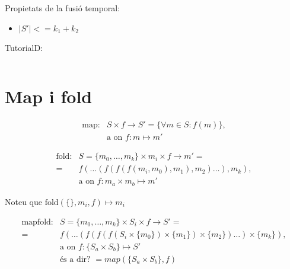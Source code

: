 Propietats de la fusió temporal:
\begin{itemize}
\item $|S'| <= k_1 + k_2$
\end{itemize}





TutorialD:
\begin{verbatim}

\end{verbatim}







\section{Map i fold}

\begin{align*}
  \text{map}:& S \times f \longrightarrow S' = \{\forall m\in S : f(m) \}, \\
             & \text{a on } f: m \mapsto m' 
\end{align*}





\begin{align*}
  \text{fold}: & S=\{m_0,\dotsc,m_k\} \times m_i \times f \longrightarrow m'= \\
               =& f(\dots(f(f(f(m_i,m_0),m_1),m_2)\dots),m_k), \\
               & \text{a on } f: m_a \times m_b \mapsto m'
\end{align*}


Noteu que $\text{fold}(\{\},m_i,f) \mapsto m_i$ 







\begin{align*}
  \text{mapfold}: & S=\{m_0,\dotsc,m_k\} \times S_i \times f \longrightarrow S'= \\
                 =& f(\dots(f(f(f(S_i\times\{m_0\})\times\{m_1\})\times\{m_2\})\dots)\times\{m_k\}), \\
                  & \text{a on } f: \{S_a \times S_b \}\mapsto S'\\
                  & \text{és a dir? } =map( \{S_a \times S_b \},f)
\end{align*}



